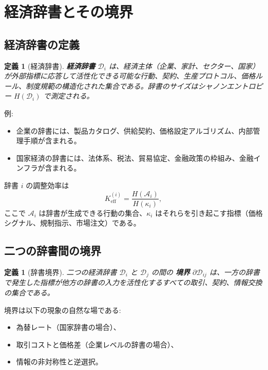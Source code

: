 \documentclass[12pt,a4paper]{article}
\newtheorem{definition}[theorem]{定義}
\theoremstyle{remark}
\begin{document}
	\section{経済辞書とその境界}
	
	\subsection{経済辞書の定義}
	
	\begin{definition}[経済辞書]
		\textbf{経済辞書} \(\mathcal{D}_i\) は、経済主体（企業、家計、セクター、国家）が外部指標に応答して活性化できる可能な行動、契約、生産プロトコル、価格ルール、制度規範の構造化された集合である。辞書のサイズはシャノンエントロピー \(H(\mathcal{D}_i)\) で測定される。
	\end{definition}
	
	例:
	\begin{itemize}
		\item 企業の辞書には、製品カタログ、供給契約、価格設定アルゴリズム、内部管理手順が含まれる。
		\item 国家経済の辞書には、法体系、税法、貿易協定、金融政策の枠組み、金融インフラが含まれる。
	\end{itemize}
	
	辞書 \(i\) の調整効率は
	\begin{equation}
		K_{\mathrm{eff}}^{(i)} = \frac{H(\mathcal{A}_i)}{H(\kappa_i)},
		\label{eq:keff_econ}
	\end{equation}
	ここで \(\mathcal{A}_i\) は辞書が生成できる行動の集合、\(\kappa_i\) はそれらを引き起こす指標（価格シグナル、規制指示、市場注文）である。
	
	\subsection{二つの辞書間の境界}
	
	\begin{definition}[辞書境界]
		二つの経済辞書 \(\mathcal{D}_i\) と \(\mathcal{D}_j\) の間の \textbf{境界} \(\partial\mathcal{D}_{ij}\) は、一方の辞書で発生した指標が他方の辞書の入力を活性化するすべての取引、契約、情報交換の集合である。
	\end{definition}
	
	境界は以下の現象の自然な場である:
	\begin{itemize}
		\item 為替レート（国家辞書の場合）、
		\item 取引コストと価格差（企業レベルの辞書の場合）、
		\item 情報の非対称性と逆選択。
	\end{itemize}
	
\end{document}
